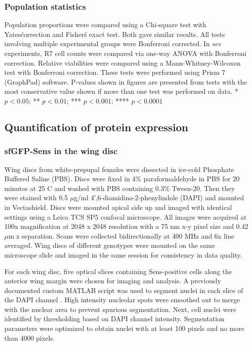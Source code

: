 \subsubsection{Population statistics}

Population proportions were compared using a Chi-square test with Yates\' correction and Fisher\'s exact test. Both gave similar results. All tests involving multiple experimental groups were Bonferroni corrected. In \textit{sev} experiments, R7 cell counts were compared via one-way ANOVA with Bonferroni correction. Relative viabilities were compared using a Mann-Whitney-Wilcoxon test with Bonferroni correction. These tests were performed using Prism 7 (GraphPad) software. P-values shown in figures are presented from tests with the most conservative value shown if more than one test was performed on data. * $p<0.05$; ** $p<0.01$; *** $p<0.001$; **** $p<0.0001$

\subsection{Quantification of protein expression}
\label{appendix:supp:metabolism:exp:measurements}

\subsubsection{sfGFP-Sens in the wing disc}
\label{appendix:supp:metabolism:exp:sens}

Wing discs from white-prepupal females were dissected in ice-cold Phosphate Buffered Saline (PBS). Discs were fixed in 4\% paraformaldehyde in PBS for 20 minutes at 25 \textdegree{}C and washed with PBS containing 0.3\% Tween-20. Then they were stained with 0.5 $\mu$g/ml 4′,6-diamidino-2-phenylindole (DAPI) and mounted in Vectashield. Discs were mounted apical side up and imaged with identical settings using a Leica TCS SP5 confocal microscope. All images were acquired at 100x magnification at 2048 x 2048 resolution with a 75 nm x-y pixel size and 0.42 $\mu$m z separation. Scans were collected bidirectionally at 400 MHz and 6x line averaged. Wing discs of different genotypes were mounted on the same microscope slide and imaged in the same session for consistency in data quality.

For each wing disc, five optical slices containing Sens-positive cells along the anterior wing margin were chosen for imaging and analysis. A previously documented custom MATLAB script was used to segment nuclei in each slice of the DAPI channel \cite{Pelaez2015}. High intensity nucleolar spots were smoothed out to merge with the nuclear area to prevent spurious segmentation. Next, cell nuclei were identified by thresholding based on DAPI channel intensity. Segmentation parameters were optimized to obtain nuclei with at least 100 pixels and no more than 4000 pixels.

